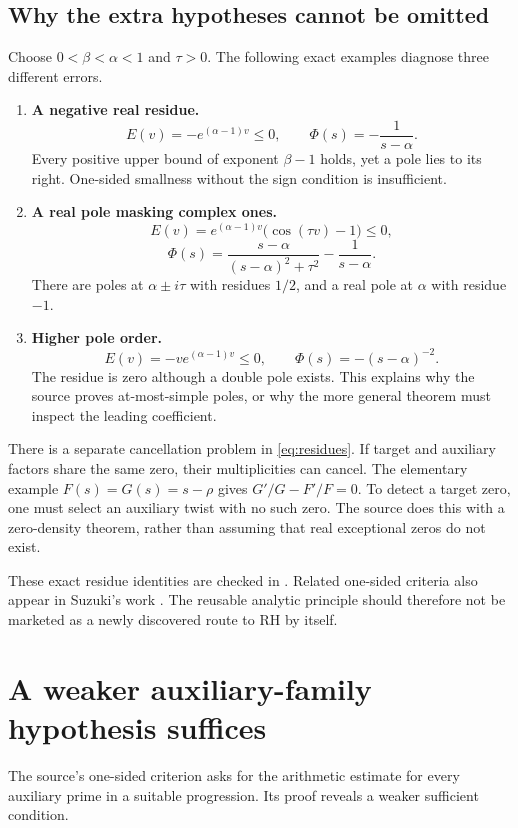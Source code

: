 \documentclass[11pt,letterpaper]{article}
\theoremstyle{definition}
\theoremstyle{remark}
\newcommand{\code}[1]{\texttt{\small\detokenize{#1}}}
\begin{document}
\subsection{Why the extra hypotheses cannot be omitted}

Choose \(0<\beta<\alpha<1\) and \(\tau>0\).
The following exact examples diagnose three different errors.
\begin{enumerate}
\item \textbf{A negative real residue.}
\[
 E(v)=-e^{(\alpha-1)v}\le0,\qquad
 \Phi(s)=-\frac1{s-\alpha}.
\]
Every positive upper bound of exponent \(\beta-1\) holds, yet a pole
lies to its right. One-sided smallness without the sign condition is
insufficient.
\item \textbf{A real pole masking complex ones.}
\[
 E(v)=e^{(\alpha-1)v}\bigl(\cos(\tau v)-1\bigr)\le0,
\]
\[
 \Phi(s)=\frac{s-\alpha}{(s-\alpha)^2+\tau^2}-\frac1{s-\alpha}.
\]
There are poles at \(\alpha\pm i\tau\) with residues \(1/2\), and a
real pole at \(\alpha\) with residue \(-1\).
\item \textbf{Higher pole order.}
\[
 E(v)=-v e^{(\alpha-1)v}\le0,\qquad
 \Phi(s)=-(s-\alpha)^{-2}.
\]
The residue is zero although a double pole exists. This explains why
the source proves at-most-simple poles, or why the more general theorem
must inspect the leading coefficient.
\end{enumerate}

There is a separate cancellation problem in \eqref{eq:residues}. If
target and auxiliary factors share the same zero, their multiplicities
can cancel. The elementary example \(F(s)=G(s)=s-\rho\) gives
\(G'/G-F'/F=0\). To detect a target zero, one must select an auxiliary
twist with no such zero. The source does this with a zero-density theorem,
rather than assuming that real exceptional zeros do not exist.

These exact residue identities are checked in
\code{code/analytic_checks.py}. Related one-sided criteria also appear
in Suzuki's work \cite{suzuki}. The reusable analytic principle should
therefore not be marketed as a newly discovered route to RH by itself.

\section{A weaker auxiliary-family hypothesis suffices}
\label{sec:sparse}

The source's one-sided criterion asks for the arithmetic estimate for
every auxiliary prime in a suitable progression. Its proof reveals a
weaker sufficient condition.
\end{document}
